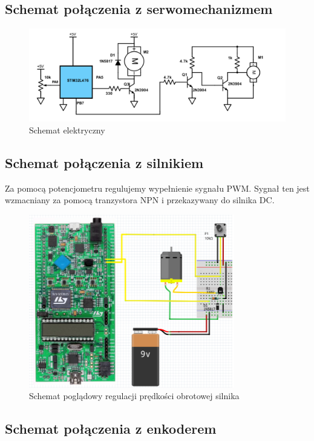 \documentclass[10pt, a4paper]{article}
\begin{document}
	\subsection{Schemat połączenia z serwomechanizmem}
	\begin{figure}[H]
		\centering
		\includegraphics[width=1\textwidth]{figures/schemeit-project.png}
		\caption{Schemat elektryczny}
		\label{fig:Schemat elektryczny}
	\end{figure}
	
	\subsection{Schemat połączenia z silnikiem}
	Za pomocą potencjometru regulujemy wypełnienie sygnału PWM. Sygnał ten jest wzmacniany za pomocą tranzystora NPN i przekazywany do silnika DC.
	
	\begin{figure}[H]
		\centering
		\includegraphics[width=0.8\textwidth]{figures/pwm.png}
		\caption{Schemat poglądowy regulacji prędkości obrotowej silnika}
		\label{fig:KonfiguracjaPWM}
	\end{figure}
	
	\subsection{Schemat połączenia z enkoderem}
\end{document}
